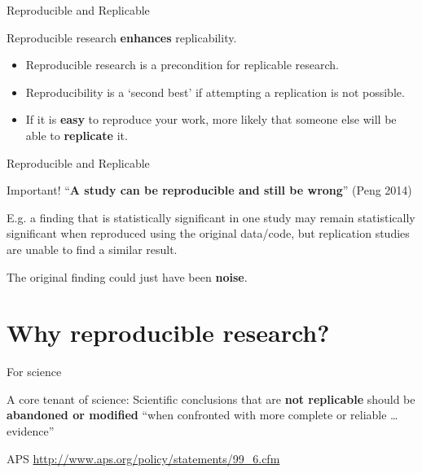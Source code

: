 \documentclass[10pt]{beamer}
\begin{document}
\begin{frame}{Reproducible and Replicable}

    Reproducible research \textbf{enhances} replicability.

    \begin{itemize}
        \item Reproducible research is a precondition for replicable research.

        \vspace{0.5cm}

        \item Reproducibility is a `second best' if attempting a replication is not possible.

        \vspace{0.5cm}

        \item If it is \textbf{easy} to reproduce your work, more likely that someone else will be able to \textbf{replicate} it.
    \end{itemize}

\end{frame}

\begin{frame}{Reproducible and Replicable}

    \begin{alertblock}{Important!}
        ``\textbf{A study can be reproducible and still be wrong}'' (Peng 2014)

        \vspace{0.5cm}

        E.g. a finding that is statistically significant in one study may remain statistically significant when reproduced using the original data/code, but replication studies are unable to find a similar result.

        \vspace{0.5cm}

        The original finding could just have been \textbf{noise}.
    \end{alertblock}

\end{frame}

\section{Why reproducible research?}

\begin{frame}{For science}

    A \alert{core tenant} of science: Scientific conclusions that are \textbf{not replicable} should be \textbf{abandoned or modified} ``when confronted with more complete or reliable \ldots evidence''

{\tiny{APS \url{http://www.aps.org/policy/statements/99_6.cfm}}}

\end{frame}
\end{document}
